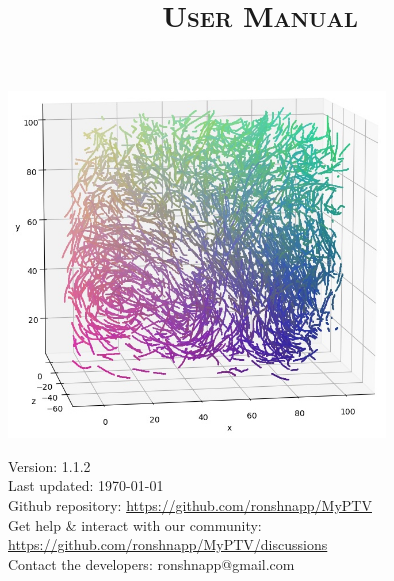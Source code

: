 \documentclass[10pt,a4paper]{article}
\title{\Huge \sffamily \textsc{\textbf{User Manual}}}
\author{}%
\date{}
\begin{document}
	
	


	
\maketitle

\thispagestyle{empty}
\vspace{2.5cm}

\begin{center}
	\includegraphics[width=10cm]{traj_image.jpg}
\end{center}

\vfill

\begin{minipage}{14cm}
	{\small \sffamily
	Version: 1.1.2 \\
	Last updated: \today \\
	Github repository: \url{https://github.com/ronshnapp/MyPTV} \\
	Get help \& interact with our community: \url{https://github.com/ronshnapp/MyPTV/discussions}\\
	Contact the developers: ronshnapp@gmail.com}
\end{minipage}



\newpage
\tableofcontents
{}
\newpage









\end{document}
